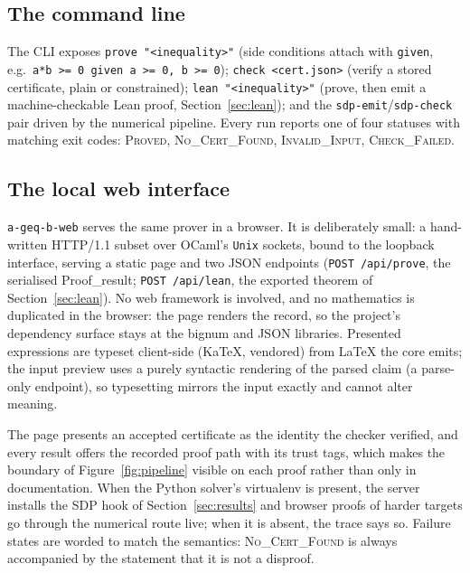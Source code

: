 \documentclass[11pt]{article}
\theoremstyle{definition}
\theoremstyle{plain}
\begin{document}
\subsection{The command line}

The CLI exposes \texttt{prove "<inequality>"} (side conditions attach with
\texttt{given}, e.g.\ \texttt{a*b >= 0 given a >= 0, b >= 0});
\texttt{check <cert.json>} (verify a stored certificate, plain or constrained);
\texttt{lean "<inequality>"} (prove, then emit a machine-checkable Lean proof,
Section~\ref{sec:lean}); and the \texttt{sdp-emit}/\texttt{sdp-check} pair
driven by the numerical pipeline. Every run reports one of four statuses with
matching exit codes: \textsc{Proved}, \textsc{No\_Cert\_Found},
\textsc{Invalid\_Input}, \textsc{Check\_Failed}.

\subsection{The local web interface}

\texttt{a-geq-b-web} serves the same prover in a browser. It is deliberately
small: a hand-written HTTP/1.1 subset over OCaml's \texttt{Unix} sockets, bound
to the loopback interface, serving a static page and two JSON endpoints
(\texttt{POST /api/prove}, the serialised \textsf{Proof\_result};
\texttt{POST /api/lean}, the exported theorem of Section~\ref{sec:lean}). No
web framework is involved, and no mathematics is duplicated in the browser: the
page renders the record, so the project's dependency surface stays at the
bignum and JSON libraries. Presented expressions are typeset client-side
(KaTeX, vendored) from LaTeX the core emits; the input preview uses a purely
syntactic rendering of the parsed claim (a parse-only endpoint), so
typesetting mirrors the input exactly and cannot alter meaning.

The page presents an accepted certificate as the identity the checker verified,
and every result offers the recorded proof path with its trust tags, which
makes the boundary of Figure~\ref{fig:pipeline} visible on each proof rather
than only in documentation. When the Python solver's virtualenv is present, the
server installs the SDP hook of Section~\ref{sec:results} and browser proofs
of harder targets go through the numerical route live; when it is absent, the
trace says so. Failure states are worded to match the semantics:
\textsc{No\_Cert\_Found} is always accompanied by the statement that it is not
a disproof.

\end{document}

